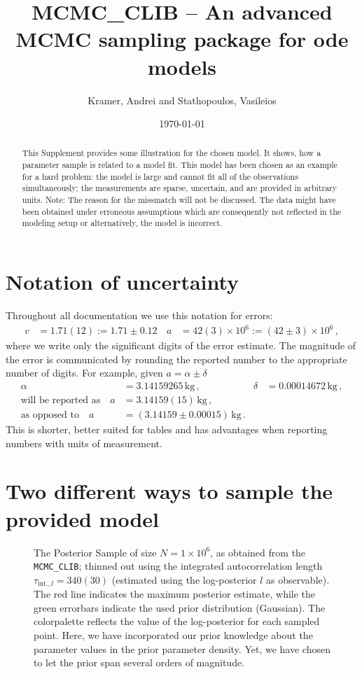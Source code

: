 \documentclass[english]{scrartcl}
\author{Kramer, Andrei and Stathopoulos, Vasileios}
\title{MCMC\_CLIB -- An
advanced MCMC sampling package for ode models}
\date{\today}
\begin{document}
\maketitle
\begin{abstract}
  This Supplement provides some illustration for the chosen model. It
  shows, how a parameter sample is related to a model fit. This model
  has been chosen as an example for a hard problem: the model is large
  and cannot fit all of the observations simultaneously; the
  measurements are sparse, uncertain, and are provided in arbitrary
  units. Note: The reason for the missmatch will not be discussed. The
  data might have been obtained under erroneous assumptions which are
  consequently not reflected in the modeling setup or alternatively,
  the model is incorrect.
\end{abstract}
\section{Notation of uncertainty}
Throughout all documentation we use this notation for errors:
\begin{align}
  \label{eq:errn}
  v&=1.71(12):=1.71 \pm 0.12\, & a&=42(3)\times 10^6:=(42 \pm 3)\times 10^6\,,
\end{align}
where we write only the significant digits of the error estimate. The
magnitude of the error is communicated by rounding the reported number
to the appropriate number of digits. For example, given $a=\alpha \pm \delta$
\begin{align}
  \alpha&=3.14159265\,\text{kg}\,,&\delta&=0.00014672\,\text{kg}\,,\\
  \text{will be reported as}\quad a&=3.14159(15)\,\text{kg}\,,\\
  \text{as opposed to}\quad a&=(3.14159\pm0.00015)\,\text{kg}\,.
\end{align}
This is shorter, better suited for tables and has advantages when
reporting numbers with units of measurement.

\section{Two different ways to sample the provided model}

\begin{figure}
  \hspace*{-1cm}
  
  \caption{The Posterior Sample of size $N=1\times10^6$, as obtained
    from the \texttt{MCMC\_CLIB}; thinned out using the integrated
    autocorrelation length $\tau_{\text{int.},l}=340(30)$ (estimated
    using the log-posterior $l$ as observable). The red line indicates
    the maximum posterior estimate, while the green errorbars indicate
    the used prior distribution (Gaussian). The colorpalette reflects
    the value of the log-posterior for each sampled point.  Here, we
    have incorporated our prior knowledge about the parameter values
    in the prior parameter density. Yet, we have chosen to let the
    prior span several orders of magnitude.\label{fig:pc-sample}}
\end{figure}
\end{document}
